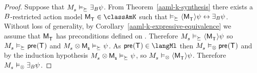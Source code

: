 \begin{proof}
Suppose that $\kPModel{\kStateS} \entails_{\simulates} \someactsBs \psi$.
From Theorem~\ref{aaml-k-synthesis} there exists a $B$-restricted action model $\aPModel{\aStatesT} \in \classAmK$ such that $\entails_{\simulates} \actionE{\aPModel{\aStatesT}} \psi \iff \someactsBs \psi$.
Without loss of generality, by Corollary~\ref{aaml-k-expressive-equivalence} we assume that $\aPModel{\aStatesT}$ has preconditions defined on \langMl{}.
Therefore $\kPModel{\kStateS} \entails_{\simulates} \actionE{\aPModel{\aStatesT}} \psi$ so $\kPModel{\kStateS} \entails_{\simulates} \aPrecondition(\aStatesT)$ and $\kPModel{\kStateS} \exec \aPModel{\aStateS} \entails_{\simulates} \psi$.
As $\aPrecondition(\aStatesT) \in \langMl$ then $\kPModel{\kStateS} \entails_\exec \aPrecondition(\aStatesT)$ and by the induction hypothesis $\kPModel{\kStateS} \exec \aPModel{\aStateS} \entails_{\simulates} \psi$, so $\kPModel{\kStateS} \entails_\exec \actionE{\aPModel{\aStatesT}} \psi$. 
Therefore $\kPModel{\kStateS} \entails_\exec \someactsBs \psi$.
\end{proof}
